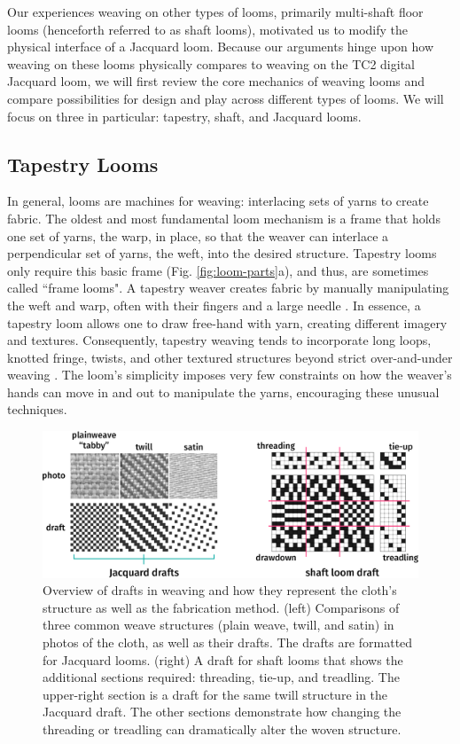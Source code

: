 Our experiences weaving on other types of looms, primarily multi-shaft floor looms (henceforth referred to as shaft looms), motivated us to modify the physical interface of a Jacquard loom. Because our arguments hinge upon how weaving on these looms physically compares to weaving on the TC2 digital Jacquard loom, we will first review the core mechanics of weaving looms and compare possibilities for design and play across different types of looms. We will focus on three in particular: tapestry, shaft, and Jacquard looms.

\subsection{Tapestry Looms}

In general, looms are machines for weaving: interlacing sets of yarns to create fabric. The oldest and most fundamental loom mechanism is a frame that holds one set of yarns, the warp, in place, so that the weaver can interlace a perpendicular set of yarns, the weft, into the desired structure. Tapestry looms only require this basic frame (Fig. \ref{fig:loom-parts}a), and thus, are sometimes called ``frame looms". A tapestry weaver creates fabric by manually manipulating the weft and warp, often with their fingers and a large needle \cite{mezoff_art_2020, moodie_loom_2016}. In essence, a tapestry loom allows one to draw free-hand with yarn, creating different imagery and textures. Consequently, tapestry weaving tends to incorporate long loops, knotted fringe, twists, and other textured structures beyond strict over-and-under weaving \cite{rousseau_contemporary_2023}. The loom's simplicity imposes very few constraints on how the weaver's hands can move in and out to manipulate the yarns, encouraging these unusual techniques.

\begin{figure}
    \centering
    \includegraphics[width=0.7\linewidth]{figs/LP_3_drafts.png}
    \caption[Overview of weaving drafts and how they differ across looms.]{Overview of drafts in weaving and how they represent the cloth’s structure as well as the fabrication method. (left) Comparisons of three common weave structures (plain weave, twill, and satin) in photos of the cloth, as well as their drafts. The drafts are formatted for Jacquard looms. (right) A draft for shaft looms that shows the additional sections required: threading, tie-up, and treadling. The upper-right section is a draft for the same twill structure in the Jacquard draft. The other sections demonstrate how changing the threading or treadling can dramatically alter the woven structure.}
    \label{fig:drafts}
\end{figure}


